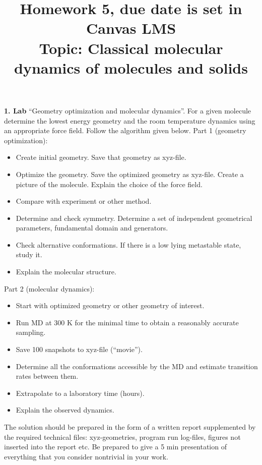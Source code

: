 \documentclass{homework}
\begin{document}
\title{Homework 5, due date is set in Canvas LMS\\ Topic: Classical molecular dynamics of molecules and solids}
\maketitle

\textbf{1. Lab} ``Geometry optimization and molecular dynamics''. For a given molecule determine the lowest energy geometry and the room temperature dynamics using an appropriate force field. Follow the algorithm given below. Part 1 (geometry optimization):
\begin{itemize}\setlength{\itemsep}{0ex}
\item Create initial geometry. Save that geometry as xyz-file.
\item Optimize the geometry. Save the optimized geometry as xyz-file. Create a picture of the molecule. Explain the choice of the force field.
\item Compare with experiment or other method.
\item Determine and check symmetry. Determine a set of independent geometrical parameters, fundamental domain and generators.
\item Check alternative conformations. If there is a low lying metastable state, study it.
\item Explain the molecular structure.
\end{itemize}
Part 2 (molecular dynamics):
\begin{itemize}\setlength{\itemsep}{0ex}
\item Start with optimized geometry or other geometry of interest.
\item Run MD at 300 K for the minimal time to obtain a reasonably accurate sampling.
\item Save 100 snapshots to xyz-file (``movie'').
\item Determine all the conformations accessible by the MD and estimate transition rates between them.
\item Extrapolate to a laboratory time (hours).
\item Explain the observed dynamics.
\end{itemize}
The solution should be prepared in the form of a written report supplemented by the required technical files: xyz-geometries, program run log-files, figures not inserted into the report etc. Be prepared to give a 5 min presentation of everything that you consider nontrivial in your work.
\end{document}
